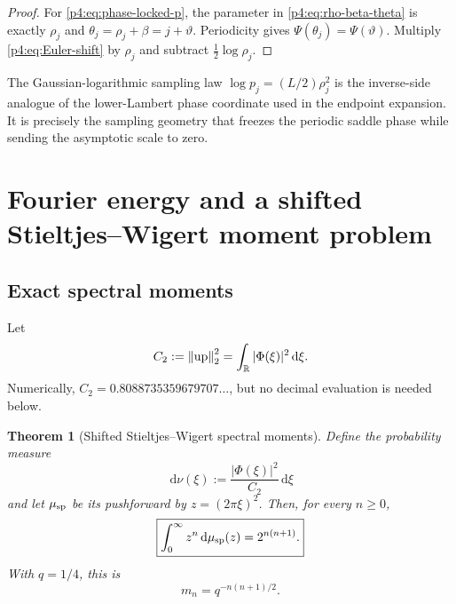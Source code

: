 \documentclass[11pt,oneside]{article}
\newtheorem{theorem}{Theorem}[section]
\theoremstyle{definition}
\theoremstyle{remark}
\newcommand{\R}{\mathbb R}
\newcommand{\Up}{\operatorname{up}}
\newcommand{\dd}{\,\mathrm d}
\begin{document}
\begin{proof}
For \eqref{p4:eq:phase-locked-p}, the parameter in \eqref{p4:eq:rho-beta-theta} is exactly
$\rho_j$ and $\theta_j=\rho_j+\beta=j+\vartheta$.  Periodicity gives
$\Psi(\theta_j)=\Psi(\vartheta)$.  Multiply \eqref{p4:eq:Euler-shift} by $\rho_j$ and subtract
$\frac12\log\rho_j$.
\end{proof}

\begin{remark}
The Gaussian-logarithmic sampling law $\log p_j=(L/2)\rho_j^2$ is the inverse-side analogue
of the lower-Lambert phase coordinate used in the endpoint expansion.  It is precisely the
sampling geometry that freezes the periodic saddle phase while sending the asymptotic scale
to zero.
\end{remark}

\section{Fourier energy and a shifted Stieltjes--Wigert moment problem}
\label{p4:sec:stieltjes-wigert}

\subsection{Exact spectral moments}

Let
\begin{equation}
 C_2:=\norm{\Up}_2^2=\int_{\R}|\Phi(\xi)|^2\dd\xi.
 \label{p4:eq:C2}
\end{equation}
Numerically, $C_2=0.8088735359679707\ldots$, but no decimal evaluation is needed below.

\begin{theorem}[Shifted Stieltjes--Wigert spectral moments]
\label{p4:thm:spectral-moments}
Define the probability measure
\begin{equation}
 \dd\nu(\xi):=\frac{|\Phi(\xi)|^2}{C_2}\dd\xi
 \label{p4:eq:nu-frequency}
\end{equation}
and let $\mu_{\rm sp}$ be its pushforward by
$z=(2\pi\xi)^2$.  Then, for every $n\geq0$,
\begin{equation}
 \boxed{
 \int_0^\infty z^n\dd\mu_{\rm sp}(z)
 =2^{n(n+1)}.}
 \label{p4:eq:spectral-moment-sequence}
\end{equation}
With $q=1/4$, this is
\begin{equation}
 m_n=q^{-n(n+1)/2}.
 \label{p4:eq:q-moments}
\end{equation}
\end{theorem}
\end{document}
